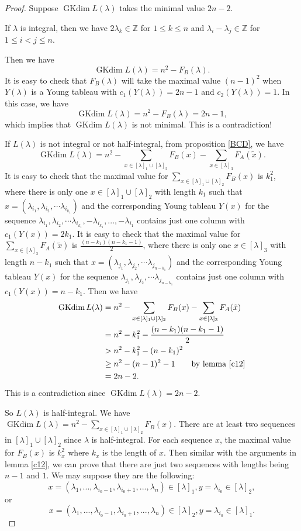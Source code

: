 \documentclass{amsart}[12pt]
\newcommand{\gkd}{\operatorname{GKdim}}
\numberwithin{equation}{section}
\begin{document}
\begin{proof}
Suppose $\gkd L(\lambda)$ takes the minimal value $2n-2$.



 If $\lambda$ is integral, then  we have  $2\lambda_k\in  \mathbb{Z}$ for $1\leq k\leq n $ and $\lambda_i-\lambda_j \in \mathbb{Z}$ for $1\leq i<j\leq n$.	

Then  we have
 \[
 \gkd L(\lambda)=n^2-F_B(\lambda).
 \]
 It is easy to check that $F_B(\lambda)$  will take the maximal value $(n-1)^2$ when $ Y(\lambda) $ is a Young tableau with $c_1(Y(\lambda))=2n-1$ and  $c_2(Y(\lambda))=1$. In this case, we have \[
 \gkd L(\lambda)=n^2-F_B(\lambda)=2n-1,
 \]
 which implies that $\gkd L(\lambda)$ is not minimal. This is a contradiction!


If $L(\lambda)$ is not integral or not half-integral, from proposition \ref{BCD}, we have 	\[
\gkd L(\lambda)=	n^2-\sum _{x\in [\lambda]_1\cup [\lambda]_2} F_B(x)-\sum _{x\in [\lambda]_3} F_A(\tilde{x}).
\]
It is easy to check that the maximal value for  $\sum\limits_{x\in [\lambda]_1\cup [\lambda]_2} F_B(x)$ is $k_1^2$, where there is only one $x \in [\lambda]_1\cup [\lambda]_2$ with length $k_1$ such that $ x=(\lambda_{i_1}, \lambda_{i_2},\cdots \lambda_{i_{k_1}})$ and the corresponding Young tableau $Y(x)$ for the sequence $\lambda_{i_1}, \lambda_{i_2},\cdots \lambda_{i_{k_1}}, -\lambda_{i_{k_1}},...,-\lambda_{i_1}$ contains just one column with
		$c_1(Y(x))=2k_1$.
It is easy to check that the maximal value for $\sum\limits_{x\in [\lambda]_3} F_A(\tilde{x})$ is $\frac{(n-k_1)(n-k_1-1)}{2}$, where there is only one $x \in [\lambda]_3$ with length $n-k_1$ such that $ x=(\lambda_{j_1}, \lambda_{j_2},\cdots \lambda_{j_{n-k_1}})$ and the corresponding Young tableau $Y(x)$ for the sequence $\lambda_{j_1}, \lambda_{j_2},\cdots \lambda_{j_{n-k_1}}$ contains just one column with
$c_1(Y(x))=n-k_1$.
Then we have
\begin{align*}
\gkd L(\lambda)&=	n^2-\sum _{x\in [\lambda]_1\cup [\lambda]_2} F_B(x)-\sum _{x\in [\lambda]_3} F_A(\tilde{x})\\
&=n^2-k_1^2-\frac{(n-k_1)(n-k_1-1)}{2}\\
&>n^2-k_1^2-(n-k_1)^2\\
&\geq n^2-(n-1)^2-1 \quad \quad \text{by lemma}~ \ref{c12}\\
&=2n-2.
\end{align*}
This is a contradiction since  $\gkd L(\lambda)=2n-2$.

So $L(\lambda)$ is half-integral. We have $\gkd L(\lambda)=	n^2-\sum\limits_{x\in [\lambda]_1\cup [\lambda]_2} F_B(x)$.
There are at least two sequences in $[\lambda]_1\cup [\lambda]_2$ since $\lambda$ is half-integral. For each sequence $x$, the maximal value for $F_B(x)$ is $k_x^2$ where $k_x$ is the length of $x$. Then similar with the arguments in lemma \ref{c12}, we can prove that there are just two sequences with lengths being $n-1$ and $1$. We may suppose they are the following:
$$x=(\lambda_1,...,\lambda_{i_{0}-1},\lambda_{i_0+1},...,\lambda_n)\in [\lambda]_1, y=\lambda_{i_0}\in [\lambda]_2,$$
or $$x=(\lambda_1,...,\lambda_{i_{0}-1},\lambda_{i_0+1},...,\lambda_n)\in [\lambda]_2, y=\lambda_{i_0}\in [\lambda]_1.$$


\end{proof}
\end{document}
